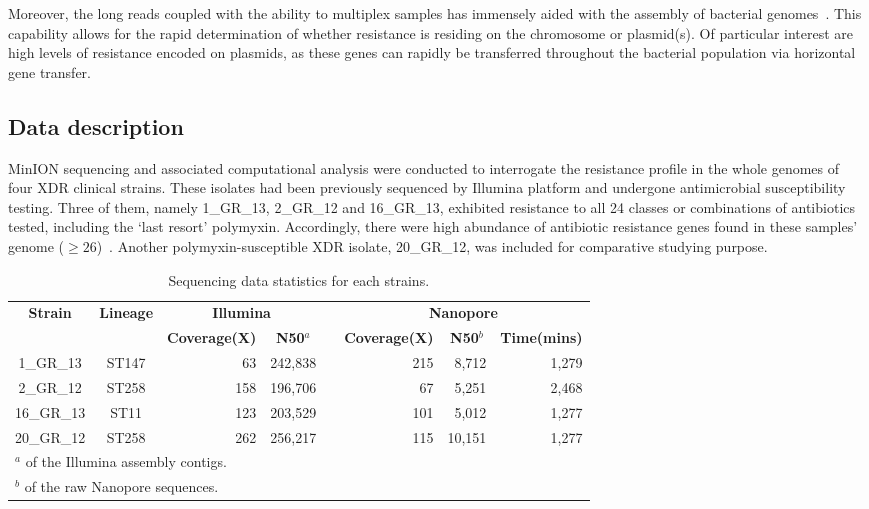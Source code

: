 Moreover, the long reads coupled with the ability to multiplex samples has immensely aided with the assembly of bacterial genomes~\cite{Nguyen2017barcode,Wick2017M12,Li2018M13,George2017M14}. 
This capability allows for the rapid determination of whether resistance is residing on the chromosome or plasmid(s). 
Of particular interest are high levels of resistance encoded on plasmids, as these genes can rapidly be transferred throughout the bacterial population via horizontal gene transfer.

\subsection{Data description}
MinION sequencing and associated computational analysis were conducted to interrogate the resistance profile in the whole genomes of four XDR clinical \kp{} strains. These isolates had been previously sequenced by Illumina platform and undergone antimicrobial susceptibility testing.
Three of them, namely 1\_GR\_13, 2\_GR\_12 and 16\_GR\_13, exhibited resistance to all 24 classes or combinations of antibiotics tested, including the `last resort' polymyxin. Accordingly, there were high abundance of antibiotic resistance genes found in these samples' genome ($\geq 26$)~\cite{Miranda2018}. 
Another polymyxin-susceptible XDR isolate, 20\_GR\_12, was included for comparative studying purpose.
\begin{table}[!hpt]
\centering
\caption{Sequencing data statistics for each \kp{} strains.}
\label{tab:assers_stats}
\begin{tabular}{ccrrlrrr}
\hline
\toprule
\multirow{2}{*}{\textbf{Strain}} & \multirow{2}{*}{\textbf{Lineage}} & \multicolumn{2}{c}{\textbf{Illumina}} & & \multicolumn{3}{c}{\textbf{Nanopore}}\\ 
\cline{3-4} 
\cline{6-8}
&   & \multicolumn{1}{c}{\textbf{Coverage(X)}} & \multicolumn{1}{c}{\textbf{N50$^a$}} & & \multicolumn{1}{c}{\textbf{Coverage(X)}} & \multicolumn{1}{c}{\textbf{N50$^b$}} & \textbf{Time(mins)} \\ 
\hline
\rowcolor{Gray}                                 
1\_GR\_13   & ST147   & 63   & 242,838  & & 215  & 8,712  & 1,279 \\
2\_GR\_12   & ST258   & 158  & 196,706  & & 67   & 5,251  & 2,468 \\ 
\rowcolor{Gray}
16\_GR\_13  & ST11    & 123  & 203,529  & & 101  & 5,012  & 1,277 \\ 
20\_GR\_12  & ST258   & 262  & 256,217  & & 115  & 10,151 & 1,277 \\ 
\hline
\multicolumn{7}{l}{\small{$^a$ of the Illumina assembly contigs.}}\\
\multicolumn{7}{l}{\small{$^b$ of the raw Nanopore sequences.}}
\end{tabular}
\end{table}

